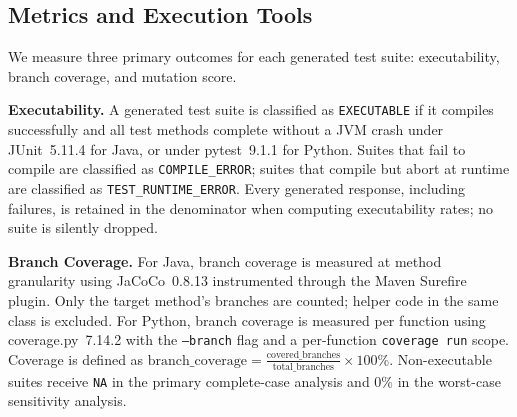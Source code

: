 \documentclass[conference]{IEEEtran}
\begin{document}
\begin{table}[htbp]
\centering
\caption{Token Consumption and Cost Details}
\label{tab:token_cost}
\end{table}

\subsection{Metrics and Execution Tools}
\label{subsec:metrics}

We measure three primary outcomes for each generated test suite: executability,
branch coverage, and mutation score.

\textbf{Executability.}
A generated test suite is classified as \texttt{EXECUTABLE} if it compiles
successfully and all test methods complete without a JVM crash under JUnit~5.11.4
for Java, or under pytest~9.1.1 for Python.
Suites that fail to compile are classified as \texttt{COMPILE\_ERROR}; suites
that compile but abort at runtime are classified as \texttt{TEST\_RUNTIME\_ERROR}.
Every generated response, including failures, is retained in the denominator when
computing executability rates; no suite is silently dropped.

\textbf{Branch Coverage.}
For Java, branch coverage is measured at method granularity using JaCoCo~0.8.13
instrumented through the Maven Surefire plugin.
Only the target method's branches are counted; helper code in the same class is
excluded.
For Python, branch coverage is measured per function using coverage.py~7.14.2
with the \texttt{--branch} flag and a per-function \texttt{coverage run} scope.
Coverage is defined as
$\text{branch\_coverage} = \frac{\text{covered\_branches}}{\text{total\_branches}} \times 100\%$.
Non-executable suites receive \texttt{NA} in the primary complete-case analysis
and $0\%$ in the worst-case sensitivity analysis.
\end{document}
